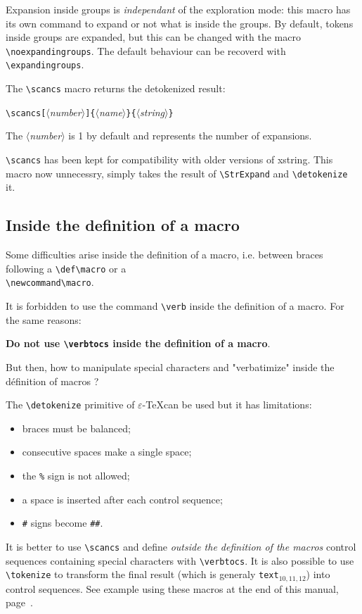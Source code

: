\documentclass[english,a4paper,10pt]{article}
\newcommand\argu[1]{$\langle$\textit{#1}$\rangle$}
\newcommand\ARGU[1]{\texttt{\{}\argu{#1}\texttt{\}}}
\newcommand\arguC[1]{\texttt{[}\argu{#1}\texttt{]}}
\newcommand\texte[1]{\texttt{text}${}_{#1}$}
\newcommand\Xstring{\textsf{xstring}\xspace}
\newcommand\verbinline{\lstinline[basicstyle=\normalsize\ttfamily]}
\begin{document}
Expansion inside groups is \emph{independant} of the exploration mode: this macro has its own command to expand or not what is inside the groups. By default, tokens inside groups are expanded, but this can be changed with the macro \verbinline-\noexpandingroups-. The default behaviour can be recoverd with \verbinline-\expandingroups-.\bigskip

The \verbinline-\scancs- macro returns the detokenized result:\par\nobreak\medskip
\verbinline|\scancs|\arguC{number}\ARGU{name}\ARGU{string}\par\nobreak\smallskip
The \argu{number} is 1 by default and represents the number of expansions.\smallskip

\verbinline-\scancs-  has been kept for compatibility with older versions of \Xstring. This macro now unnecessry, simply takes the result of \verbinline|\StrExpand| and \verbinline|\detokenize| it.

\subsection{Inside the definition of a macro}
Some difficulties arise inside the definition of a macro, i.e. between braces following a \verbinline|\def\macro| or a\\\verbinline|\newcommand\macro|.\medskip

It is forbidden to use the command \verbinline|\verb| inside the definition of a macro. For the same reasons:\par\medskip
\hfill\textbf{Do not use \texttt{\textbackslash verbtocs} inside the definition of a macro}.\hfill{}\medskip

But then, how to manipulate special characters and "verbatimize" inside the définition of macros ?\bigskip

The \verbinline|\detokenize| primitive of $\varepsilon$-\TeX can be used but it has limitations:
\begin{itemize}
	\item braces must be balanced;
	\item consecutive spaces make a single space;
	\item the \verb|%| sign is not allowed;
	\item a space is inserted after each control sequence;
	\item \verb|#| signs become  \verb|##|.
\end{itemize}
\medskip

It is better to use \verbinline|\scancs| and define \emph{outside the definition of the macros} control sequences containing special characters with \verbinline|\verbtocs|. It is also possible to use \verbinline|\tokenize| to transform the final result (which is generaly \texte{10,11,12}) into control sequences. See example using these macros at the end of this manual, page~\pageref{exemples}.\medskip
\end{document}

